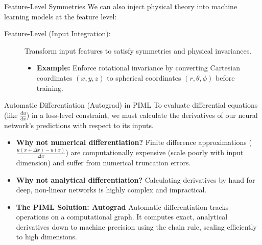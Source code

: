\documentclass[9pt]{beamer}
\begin{document}
\begin{frame}{Feature-Level Symmetries}
  We can also inject physical theory into machine learning models at the feature level:
  \begin{description}
    \item[Feature-Level (Input Integration):]
      Transform input features to satisfy symmetries and physical invariances.
      \begin{itemize}
        \item \textbf{Example:} Enforce rotational invariance by converting Cartesian coordinates $(x, y, z)$ to spherical coordinates $(r, \theta, \phi)$ before training.
      \end{itemize}
  \end{description}
\end{frame}

\begin{frame}{Automatic Differentiation (Autograd) in PIML}
  To evaluate differential equations (like $\frac{du}{dx}$) in a loss-level constraint, we must calculate the derivatives of our neural network's predictions with respect to its inputs.
  \begin{itemize}
    \item \textbf{Why not numerical differentiation?}
      Finite difference approximations ($\frac{u(x+\Delta x) - u(x)}{\Delta x}$) are computationally expensive (scale poorly with input dimension) and suffer from numerical truncation errors.
    \item \textbf{Why not analytical differentiation?}
      Calculating derivatives by hand for deep, non-linear networks is highly complex and impractical.
    \item \textbf{The PIML Solution: Autograd}
      Automatic differentiation tracks operations on a computational graph. It computes exact, analytical derivatives down to machine precision using the chain rule, scaling efficiently to high dimensions.
  \end{itemize}
\end{frame}
\end{document}
